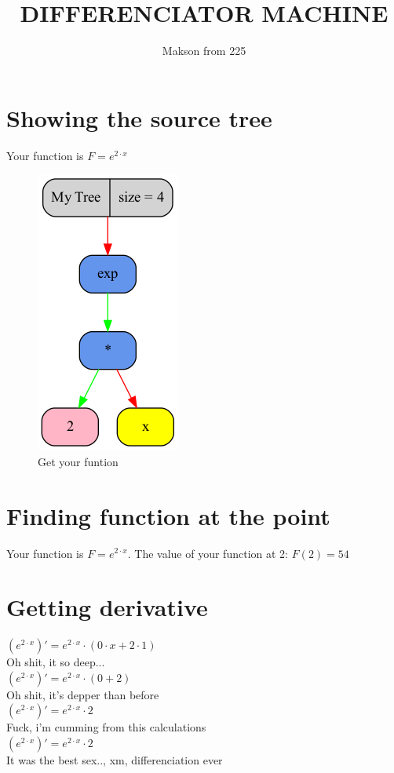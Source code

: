 \documentclass[12pt, letterpaper, twoside]{article}
\title{DIFFERENCIATOR MACHINE}
\author{Makson from 225}
\date{}
\begin{document}
\maketitle
\newpage
\section{Showing the source tree}
\begin{center}
Your function is $F = e^{2 \cdot x}$\newline 
\begin{figure}
\begin{center}
\includegraphics [scale = 0.4]{graphics/graph2.png}
\caption{Get your funtion}
\end{center}
\end{figure}
\end{center}
\newpage
\section{Finding function at the point}
\begin{center}
Your function is $F = e^{2 \cdot x}$.
The value of your function at 2: $ F(2) = 54 $
\end{center}
\newpage
\section{Getting derivative}
\begin{center}
$(e^{2 \cdot x})' = e^{2 \cdot x} \cdot (0 \cdot x + 2 \cdot 1)$\\
Oh shit, it so deep...\\
$(e^{2 \cdot x})' = e^{2 \cdot x} \cdot (0 + 2)$\\
Oh shit, it's depper than before\\
$(e^{2 \cdot x})' = e^{2 \cdot x} \cdot 2$\\
Fuck, i'm cumming from this calculations\\
$(e^{2 \cdot x})' = e^{2 \cdot x} \cdot 2$\\
It was the best sex.., xm, differenciation ever
\end{center}
\newpage
\end{document}
